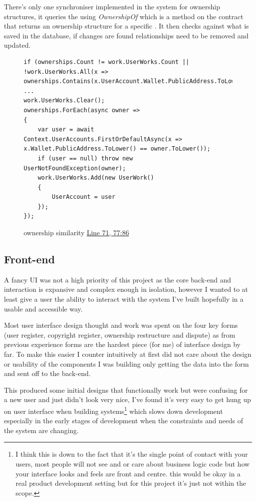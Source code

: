 There's only one synchroniser implemented in the system for ownership structures, it queries the  using \textit{OwnershipOf} which is a method on the contract that returns an ownership structure for a specific . It then checks against what is saved in the database, if changes are found relationships need to be removed and updated.

\begin{figure}[H]
\caption{ownership similarity \href{https://github.com/MrHarrisonBarker/CRPL/blob/main/CRPL.Web/Core/ChainSync/Synchronisers/OwnershipSynchroniser.cs}{Line 71, 77:86}}
\centering
\begin{lstlisting}[language=CSharp]
if (ownerships.Count != work.UserWorks.Count || !work.UserWorks.All(x => ownerships.Contains(x.UserAccount.Wallet.PublicAddress.ToLower())))
...
work.UserWorks.Clear();
ownerships.ForEach(async owner =>
{
	var user = await Context.UserAccounts.FirstOrDefaultAsync(x => x.Wallet.PublicAddress.ToLower() == owner.ToLower());
	if (user == null) throw new UserNotFoundException(owner);
	work.UserWorks.Add(new UserWork()
	{
		UserAccount = user
	});
});
\end{lstlisting}
\end{figure}

\subsection{Front-end}

A fancy UI was not a high priority of this project as the core back-end and  interaction is expansive and complex enough in isolation, however I wanted to at least give a user the ability to interact with the system I've built hopefully in a usable and accessible way.

Most user interface design thought and work was spent on the four key forms (user register, copyright register, ownership restructure and dispute) as from previous experience forms are the hardest piece (for me) of interface design by far. To make this easier I counter intuitively at first did not care about the design or usability of the components I was building only getting the data into the form and sent off to the back-end.

This produced some initial designs that functionally work but were confusing for a new user and just didn't look very nice, I've found it's very easy to get hung up on user interface when building systems\footnote{I think this is down to the fact that it's the single point of contact with your users, most people will not see and or care about business logic code but how your interface looks and feels are front and centre. this would be okay in a real product development setting but for this project it's just not within the scope.} which slows down development especially in the early stages of development when the constraints and needs of the system are changing.

